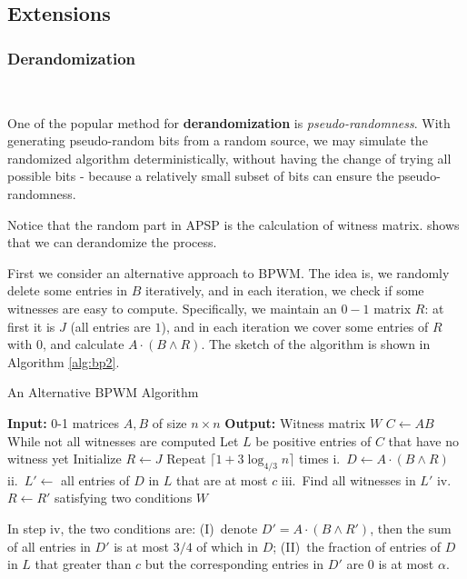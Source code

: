\documentclass[11pt]{article}
\theoremstyle{plain}
\begin{document}
\subsection{Extensions}

\subsubsection{Derandomization}\

One of the popular method for \textbf{derandomization} is \textit{pseudo-randomness}. With generating pseudo-random bits from a random source, we may simulate the randomized algorithm deterministically, without having the change of trying all possible bits - because a relatively small subset of bits can ensure the pseudo-randomness.

Notice that the random part in APSP is the calculation of witness matrix. \cite{267748} shows that we can derandomize the process. 

First we consider an alternative approach to BPWM. The idea is, we randomly delete some entries in $B$ iteratively, and in each iteration, we check if some witnesses are easy to compute. Specifically, we maintain an $0-1$ matrix $R$: at first it is $J$ (all entries are $1$), and in each iteration we cover some entries of $R$ with $0$, and calculate $A\cdot (B\land R)$. The sketch of the algorithm is shown in Algorithm \ref{alg:bp2}.

\begin{algorithm}
    \caption{An Alternative BPWM Algorithm}
    \label{alg:bp2}
    \begin{algorithmic}[1]
        \STATE \textbf{Input:} 0-1 matrices $A,B$ of size $n\times n$
        \STATE \textbf{Output:} Witness matrix $W$
        \STATE $C\leftarrow AB$
        \STATE While not all witnesses are computed
            \STATE\quad Let $L$ be positive entries of $C$ that have no witness yet
            \STATE\quad Initialize $R\leftarrow J$
            \STATE\quad Repeat $\lceil1+3\log_{4/3}n\rceil$ times
                \STATE\quad\quad i.\ $D\leftarrow A\cdot (B\land R)$
                \STATE\quad\quad ii.\ $L'\leftarrow$ all entries of $D$ in $L$ that are at most $c$
                \STATE\quad\quad iii.\ Find all witnesses in $L'$
                \STATE\quad\quad iv.\ $R\leftarrow R'$ satisfying two conditions
    \RETURN $W$
    \end{algorithmic}
\end{algorithm}

In step iv, the two conditions are: (I)\ denote $D'=A\cdot (B\land R')$, then the sum of all entries in $D'$ is at most $3/4$ of which in $D$; (II)\ the fraction of entries of $D$ in $L$ that greater than $c$ but the corresponding entries in $D'$ are $0$ is at most $\alpha$.
\end{document}
